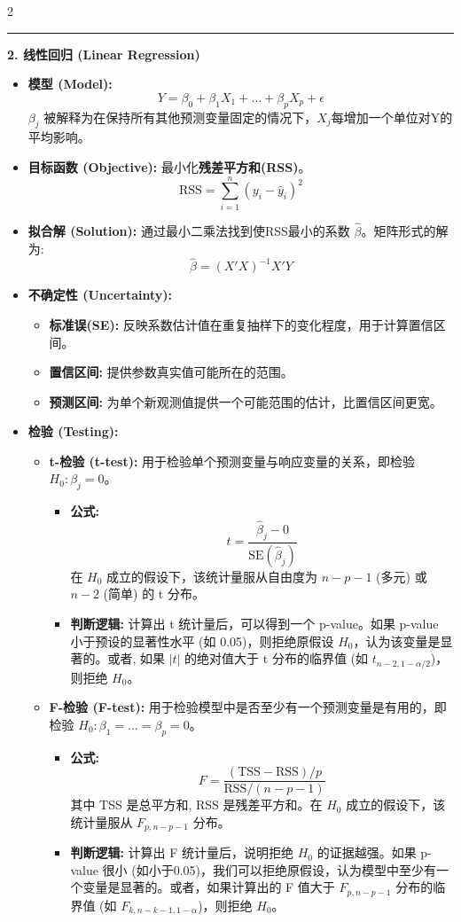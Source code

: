 \documentclass[9pt,a4paper]{article} %
\newcommand{\mysection}[1]{\vspace{0.5em}\hrule\vspace{0.3em}\noindent\textbf{\large #1}\vspace{0.1em}}
\begin{document}
\begin{multicols}{2}
\mysection{2. 线性回归 (Linear Regression)}

\begin{itemize}
    \item \textbf{模型 (Model):}
    $$ Y = \beta_0 + \beta_1X_1 + \dots + \beta_pX_p + \epsilon $$
    $\beta_j$ 被解释为在保持所有其他预测变量固定的情况下，$X_j$每增加一个单位对Y的平均影响。
    \item \textbf{目标函数 (Objective):} 最小化\textbf{残差平方和(RSS)}。
    $$ \text{RSS} = \sum_{i=1}^{n} (y_i - \hat{y}_i)^2 $$
    \item \textbf{拟合解 (Solution):} 通过最小二乘法找到使RSS最小的系数 $\hat{\beta}$。矩阵形式的解为:
    $$ \hat{\beta} = (X'X)^{-1}X'Y $$
    \item \textbf{不确定性 (Uncertainty):}
    \begin{itemize}
        \item \textbf{标准误(SE):} 反映系数估计值在重复抽样下的变化程度，用于计算置信区间。
        \item \textbf{置信区间:} 提供参数真实值可能所在的范围。
        \item \textbf{预测区间:} 为单个新观测值提供一个可能范围的估计，比置信区间更宽。
    \end{itemize}
  \item \textbf{检验 (Testing):}
    \begin{itemize}
        \item \textbf{t-检验 (t-test):} 用于检验单个预测变量与响应变量的关系，即检验 $H_0: \beta_j = 0$。
        \begin{itemize}
            \item \textbf{公式:}
            $$ t = \frac{\hat{\beta}_j - 0}{\text{SE}(\hat{\beta}_j)} $$
            在 $H_0$ 成立的假设下，该统计量服从自由度为 $n-p-1$ (多元) 或 $n-2$ (简单) 的 t 分布。
            \item \textbf{判断逻辑:} 计算出 t 统计量后，可以得到一个 p-value。如果 p-value 小于预设的显著性水平 (如 0.05)，则拒绝原假设 $H_0$，认为该变量是显著的。或者, 如果 $|t|$ 的绝对值大于 t 分布的临界值 (如 $t_{n-2, 1-\alpha/2}$)，则拒绝 $H_0$。
        \end{itemize}
        
        \item \textbf{F-检验 (F-test):} 用于检验模型中是否至少有一个预测变量是有用的，即检验 $H_0: \beta_1 = \dots = \beta_p = 0$。
        \begin{itemize}
            \item \textbf{公式:}
            $$ F = \frac{(\text{TSS}-\text{RSS})/p}{\text{RSS}/(n-p-1)} $$
            其中 TSS 是总平方和, RSS 是残差平方和。在 $H_0$ 成立的假设下，该统计量服从 $F_{p, n-p-1}$ 分布。
            \item \textbf{判断逻辑:} 计算出 F 统计量后，说明拒绝 $H_0$ 的证据越强。如果 p-value 很小 (如小于0.05)，我们可以拒绝原假设，认为模型中至少有一个变量是显著的。或者，如果计算出的 F 值大于 $F_{p, n-p-1}$ 分布的临界值 (如 $F_{k, n-k-1, 1-\alpha}$)，则拒绝 $H_0$。
        \end{itemize}
    \end{itemize}
    

\end{itemize}
\end{multicols}
\end{document}
